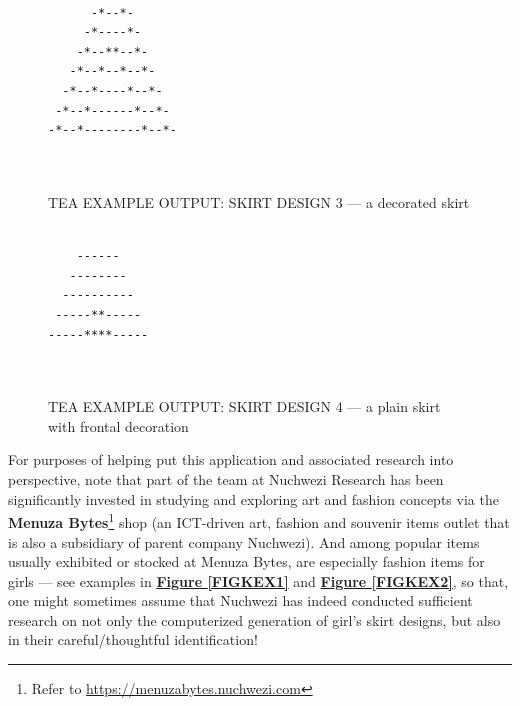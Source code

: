 \documentclass[a4paper, 18pt]{book} %
\begin{document}
\begin{figure}[H]
\LARGE
  \centering
  \begin{tcolorbox}[myterminalstyle, title=TEA Output from \textbf{\autoref{FIGKEX1}} --- SKIRT DESIGN GENERATOR]
  \begin{lstlisting}
 
      -*--*-      
     -*----*-     
    -*--**--*-    
   -*--*--*--*-   
  -*--*----*--*-  
 -*--*------*--*- 
-*--*--------*--*-
                  
             
  \end{lstlisting}
  \end{tcolorbox}
  \caption{TEA EXAMPLE OUTPUT: SKIRT DESIGN 3 --- a decorated skirt}
\end{figure}


\begin{figure}[H]
\LARGE
  \centering
  \begin{tcolorbox}[myterminalstyle, title=TEA Output from \textbf{\autoref{FIGKEX1}} --- SKIRT DESIGN GENERATOR]
  \begin{lstlisting}
 
    ------    
   --------   
  ----------  
 -----**----- 
-----****-----
                       
             
  \end{lstlisting}
  \end{tcolorbox}
  \caption{TEA EXAMPLE OUTPUT: SKIRT DESIGN 4 --- a plain skirt with frontal decoration}
\end{figure}


\vspace{2em}

For purposes of helping put this application and associated research into perspective, note that part of the team at Nuchwezi Research has been significantly invested in studying and exploring art and fashion concepts via the \textbf{Menuza Bytes}\footnote{Refer to \url{https://menuzabytes.nuchwezi.com}} shop (an ICT-driven art, fashion and souvenir items outlet that is also a subsidiary of parent company Nuchwezi). And among popular items usually exhibited or stocked at Menuza Bytes, are especially fashion items for girls --- see examples in \textbf{\hyperref[FIGKEX1]{Figure \ref{FIGKEX1}}} and \textbf{\hyperref[FIGKEX2]{Figure \ref{FIGKEX2}}}, so that, one might sometimes assume that Nuchwezi has indeed conducted sufficient research on not only the computerized generation of girl's skirt designs, but also in their careful/thoughtful identification!
\end{document}
